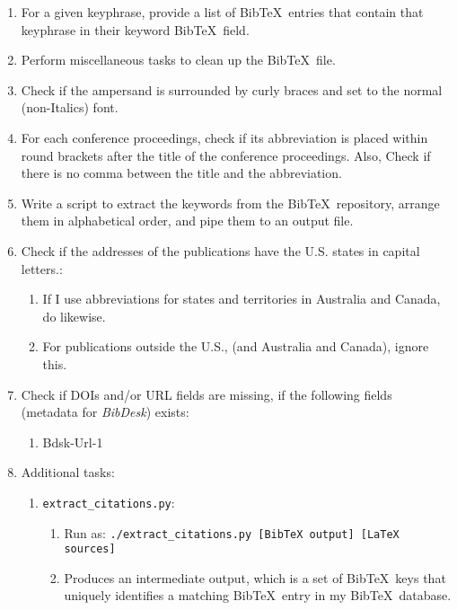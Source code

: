 \begin{enumerate}
\item For a given keyphrase, provide a list of {\sc Bib}\TeX\ entries that contain that keyphrase in their keyword {\sc Bib}\TeX\ field.
\item Perform miscellaneous tasks to clean up the {\sc Bib}\TeX\ file.
\item Check if the ampersand is surrounded by curly braces and set to the normal (non-Italics) font.
\item For each conference proceedings, check if its abbreviation is placed within round brackets after the title of the conference proceedings. Also, Check if there is no comma between the title and the abbreviation.
\item Write a script to extract the keywords from the {\sc Bib}\TeX\ repository, arrange them in alphabetical order, and pipe them to an output file.
\item Check if the addresses of the publications have the U.S. states in capital letters.: \vspace{-0.3cm}
	\begin{enumerate} \itemsep -2pt
	\item If I use abbreviations for states and territories in Australia and Canada, do likewise.
	\item For publications outside the U.S., (and Australia and Canada), ignore this.
	\end{enumerate}
\item Check if DOIs and/or URL fields are missing, if the following fields (metadata for {\it BibDesk}) exists: \vspace{-0.3cm}
	\begin{enumerate} \itemsep -2pt
	\item Bdsk-Url-1
	\end{enumerate}
\item Additional tasks: \vspace{-0.3cm}
	\begin{enumerate} \itemsep -2pt
	\item {\tt extract\_citations.py}: \vspace{-0.2cm}
		\begin{enumerate} \itemsep -2pt
		\item Run as: {\tt ./extract\_citations.py [BibTeX output] [LaTeX sources]}
		\item Produces an intermediate output, which is a set of {\sc Bib}\TeX\ keys that uniquely identifies a matching {\sc Bib}\TeX\ entry in my {\sc Bib}\TeX\ database.
		\end{enumerate}

\end{enumerate}
\end{enumerate}
